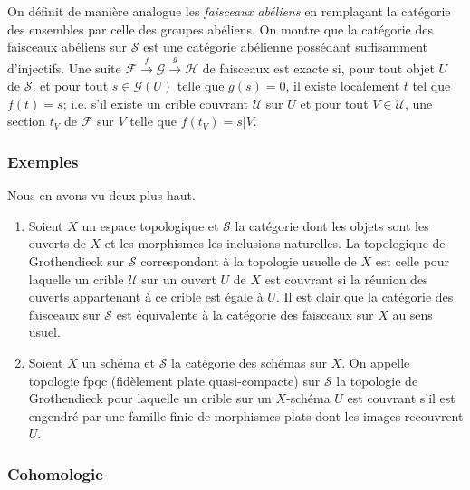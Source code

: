 \documentclass{book}
\newcommand{\cF}{\mathcal{F}}
\newcommand{\cG}{\mathcal{G}}
\newcommand{\cH}{\mathcal{H}}
\newcommand{\sS}{\mathscr{S}}
\newcommand{\sU}{\mathscr{U}}
\begin{document}
On définit de manière analogue les \emph{faisceaux abéliens} en 
remplaçant la catégorie des ensembles par celle des groupes abéliens. On 
montre que la catégorie des faisceaux abéliens sur $\sS$ est une 
catégorie abélienne possédant suffisamment d'injectifs. Une suite 
$\cF\xrightarrow f \cG\xrightarrow g \cH$ de faisceaux est exacte si, pour 
tout objet $U$ de $\sS$, et pour tout $s\in \cG(U)$ telle que $g(s)=0$, 
il existe localement $t$ tel que $f(t)=s$; i.e. s'il existe un crible couvrant 
$\sU$ sur $U$ et pour tout $V\in\sU$, une section $t_V$ de $\cF$ sur $V$ telle 
que $f(t_V)=s|V$. 





\subsubsection{Exemples}\label{I:1-6-4}

Nous en avons vu deux plus haut. 

\begin{enumerate}[\indent a)]
  \item Soient $X$ un espace topologique et $\sS$ la catégorie dont les objets 
    sont les ouverts de $X$ et les morphismes les inclusions naturelles. La 
    topologique de Grothendieck sur $\sS$ correspondant à la topologie usuelle 
    de $X$ est celle pour laquelle un crible $\sU$ sur un ouvert $U$ de $X$ est 
    couvrant si la réunion des ouverts appartenant à ce crible est égale à 
    $U$. Il est clair que la catégorie des faisceaux sur $\sS$ est équivalente 
    à la catégorie des faisceaux sur $X$ au sens usuel. 
  \item Soient $X$ un schéma et $\sS$ la catégorie des schémas sur $X$. On 
    appelle topologie fpqc (fidèlement plate quasi-compacte) sur $\sS$ la 
    topologie de Grothendieck pour laquelle un crible sur un $X$-schéma $U$ est 
    couvrant s'il est engendré par une famille finie de morphismes plats dont  
    les images recouvrent $U$. 
\end{enumerate}





\subsubsection{Cohomologie}\label{I:1-6-5}
\end{document}
